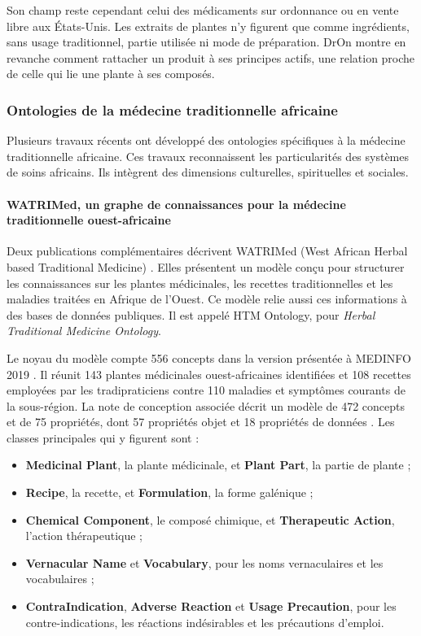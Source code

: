 Son champ reste cependant celui des médicaments sur ordonnance ou en vente libre aux États-Unis. Les extraits de plantes n'y figurent que comme ingrédients, sans usage traditionnel, partie utilisée ni mode de préparation. DrOn montre en revanche comment rattacher un produit à ses principes actifs, une relation proche de celle qui lie une plante à ses composés.

\subsubsection{Ontologies de la médecine traditionnelle africaine}
\label{subsubsec:ontologies_africaines}

Plusieurs travaux récents ont développé des ontologies spécifiques à la médecine traditionnelle africaine. Ces travaux reconnaissent les particularités des systèmes de soins africains. Ils intègrent des dimensions culturelles, spirituelles et sociales.

\paragraph{WATRIMed, un graphe de connaissances pour la médecine traditionnelle ouest-africaine}

Deux publications complémentaires décrivent WATRIMed (West African Herbal based Traditional Medicine) \cite{watrimed2019, watrimed_design_2019}. Elles présentent un modèle conçu pour structurer les connaissances sur les plantes médicinales, les recettes traditionnelles et les maladies traitées en Afrique de l'Ouest. Ce modèle relie aussi ces informations à des bases de données publiques. Il est appelé HTM Ontology, pour \textit{Herbal Traditional Medicine Ontology}.

Le noyau du modèle compte 556 concepts dans la version présentée à MEDINFO 2019 \cite{watrimed2019}. Il réunit 143 plantes médicinales ouest-africaines identifiées et 108 recettes employées par les tradipraticiens contre 110 maladies et symptômes courants de la sous-région. La note de conception associée décrit un modèle de 472 concepts et de 75 propriétés, dont 57 propriétés objet et 18 propriétés de données \cite{watrimed_design_2019}. Les classes principales qui y figurent sont :
\begin{itemize}[label={$\bullet$}, leftmargin=1cm]
    \item \textbf{Medicinal Plant}, la plante médicinale, et \textbf{Plant Part}, la partie de plante ;
    \item \textbf{Recipe}, la recette, et \textbf{Formulation}, la forme galénique ;
    \item \textbf{Chemical Component}, le composé chimique, et \textbf{Therapeutic Action}, l'action thérapeutique ;
    \item \textbf{Vernacular Name} et \textbf{Vocabulary}, pour les noms vernaculaires et les vocabulaires ;
    \item \textbf{ContraIndication}, \textbf{Adverse Reaction} et \textbf{Usage Precaution}, pour les contre-indications, les réactions indésirables et les précautions d'emploi.
\end{itemize}

